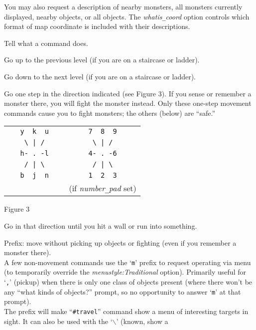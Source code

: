 You may also request a description of nearby monsters,
all monsters currently displayed, nearby objects, or all objects.
The
{\it whatis\verb+_+coord\/}
option controls which format of map coordinate is included with their
descriptions.
\item[\tb{\&}]
Tell what a command does.
\item[\tb{<}]
Go up to the previous level (if you are on a staircase or ladder).
\item[\tb{>}]
Go down to the next level (if you are on a staircase or ladder).
\item[\tb{[yuhjklbn]}]
Go one step in the direction indicated (see Figure 3).  If you sense
or remember
a monster there, you will fight the monster instead.  Only these
one-step movement commands cause you to fight monsters; the others
(below) are ``safe.''
\begin{center}
\begin{tabular}{cc}
\verb+   y  k  u   + & \verb+   7  8  9   +\\
\verb+    \ | /    + & \verb+    \ | /    +\\
\verb+   h- . -l   + & \verb+   4- . -6   +\\
\verb+    / | \    + & \verb+    / | \    +\\
\verb+   b  j  n   + & \verb+   1  2  3   +\\
                     & (if {\it number\verb+_+pad\/} set)
\end{tabular}
\end{center}
\begin{center}
Figure 3
\end{center}
\item[\tb{[YUHJKLBN]}]
Go in that direction until you hit a wall or run into something.
\item[\tb{m[yuhjklbn]}]
Prefix:  move without picking up objects or fighting (even if you remember
a monster there).\\
A few non-movement commands use the `{\tt m}' prefix to request
operating via menu (to temporarily override the
{\it menustyle:Traditional\/}
option).
Primarily useful for `{\tt ,}' (pickup) when there is only one class of
objects present (where there won't be any ``what kinds of objects?'' prompt,
so no opportunity to answer `{\tt m}' at that prompt).
\\
The prefix will
make ``{\tt \#travel}'' command show a menu of interesting targets in sight.
It can also be used with the `{\tt $\backslash$}' (known, show a
